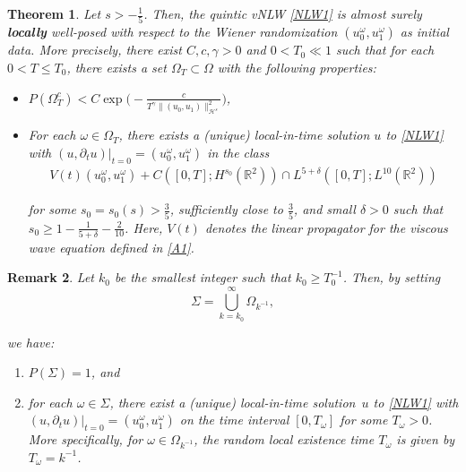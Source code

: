 \documentclass[letterpaper, 11pt,  reqno]{amsart}
\newtheorem{theorem}{Theorem} [section]
\newtheorem{remark}[theorem]{Remark}
\newcommand{\1}{\hspace{0.5mm}\text{I}\hspace{0.2mm}}
\newcommand{\noi}{\noindent}
\newcommand{\R}{\mathbb{R}}
\newcommand{\dl}{\delta}
\newcommand{\g}{\gamma}
\newcommand{\Si}{\Sigma}
\newcommand{\dt}{\partial_t}
\renewcommand{\o}{\omega}
\renewcommand{\O}{\Omega}
\renewcommand{\H}{\mathcal{H}}
\numberwithin{equation}{section}
\numberwithin{theorem}{section}
\begin{document}
\begin{theorem}\label{THM:LWP1}
Let $s > -\frac 15$.
Then, the quintic vNLW \eqref{NLW1}
is almost surely {\bf{locally}} well-posed
with respect to the Wiener randomization $(u_0^\o, u_1^\o)$
as  initial data.
More precisely, 
there exist $ C, c, \g>0$ and $0 < T_0 \ll1 $ such that
for each $0< T \le T_0$,
there exists a set $\O_T \subset \O$ with the following properties:

\smallskip
\begin{itemize}
\item[\textup{(i)}]
$\displaystyle P(\O_T^c) < C \exp\bigg(-\frac{c}{T^\g \|(u_0, u_1)\|_{\H^s}^2 }\bigg)$,

\medskip


\item[\textup{(ii)}]
For each $\o \in \O_T$, there exists a \textup{(}unique\textup{)} 
local-in-time solution $u$
to \eqref{NLW1}
with $(u, \dt u) |_{t = 0} = (u_0^\o, u_1^\o)$
in the class 
\begin{align*}
V(t)(u_0^\o, u_1^\o) +  C([0,  T]; H^{s_0} (\R^2))
\cap  L^{5+\dl}([0, T];  L^{10}(\R^2))
\end{align*}

\noi
for some $s_0 = s_0(s)> \frac 35$, sufficiently close to $\frac 35$, and small $\dl> 0$ such that $s_0 \geq  1 - \frac 1{5+\dl} - \frac 2{10}$.
Here, $V(t)$ denotes the linear propagator 
for the viscous wave equation defined in \eqref{A1}.

\end{itemize}



\end{theorem}


\begin{remark}\rm 

Let $k_0$ be the smallest integer such that $k_0 \ge T_0^{-1}$.
Then, by setting
\[ \Si = \bigcup_{k = k_0}^\infty \O_{k^{-1}}, \]

\noi
we have:
\begin{enumerate}
\item $P(\Si) = 1$, and 
\item for each $\o\in \Si$, 
there exist a (unique) local-in-time  solution~$u$
to \eqref{NLW1} 
with $(u, \dt u) |_{t = 0} = (u_0^\o, u_1^\o)$
on the time interval $[0, T_\o]$
for some $T_\o > 0$.
More specifically, 
for $\o \in \O_{k^{-1}}$, 
the random local  existence time $T_\o$ is given by $T_\o = k^{-1}$. 
\end{enumerate}
\end{remark}
\end{document}
